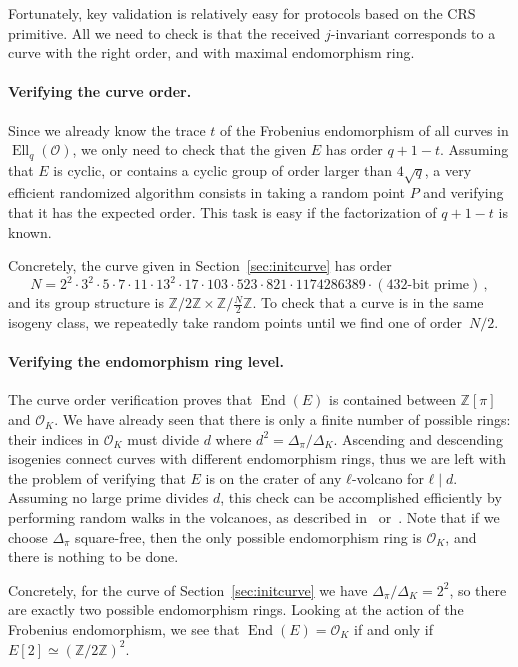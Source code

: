 \documentclass{llncs}
\renewcommand{\O}{\mathcal{O}}
\DeclareMathOperator{\End}{End}
\DeclareMathOperator{\Ell}{Ell}
\begin{document}
Fortunately, key validation is relatively easy for protocols based on
the CRS primitive. 
All we need to check is that the received $j$-invariant
corresponds to a curve with the right order, and with maximal endomorphism ring. 

\paragraph{Verifying the curve order.} Since we already know the trace $t$
of the Frobenius endomorphism of all curves in $\Ell_q(\O)$, 
we only need to check that the given $E$ has order $q+1-t$.
Assuming that $E$ is cyclic, or contains a
cyclic group of order larger than $4\sqrt{q}$, a very efficient
randomized algorithm consists in taking a random point $P$ and
verifying that it has the expected order.  This task is easy if the
factorization of $q+1-t$ is known.

Concretely, the curve given in Section~\ref{sec:initcurve} has order
\[
    N 
    = 
    2^2 · 3^2 · 5 · 7 · 11 · 13^2 · 17 · 103 · 523 · 821 · 1174286389
    · (\text{432-bit prime})
    \,,
\] %
and its group structure is
$ℤ/2ℤ×ℤ/\frac{N}{2}ℤ$. To check that a curve is in the same isogeny
class, we repeatedly take random points until we find one of order~$N/2$.

\paragraph{Verifying the endomorphism ring level.} 
The curve order verification proves that $\End(E)$ 
is contained between $ℤ[π]$ and $\O_K$. 
We have already seen that there is only a finite number of
possible rings: their indices in $\O_K$ must divide $d$ where $d^2=Δ_π/Δ_K$.
Ascending and descending isogenies connect curves with different endomorphism
rings, thus we are left with the problem of verifying that $E$ is on
the crater of any $ℓ$-volcano for $ℓ\mid d$.
Assuming no large prime divides $d$, this check can be
accomplished efficiently by performing random walks in the volcanoes,
as described in~\cite[\S4.2]{kohel} or~\cite{fouquet+morain02}. 
Note that if we choose $Δ_π$ square-free, 
then the only possible endomorphism ring is $\O_K$,
and there is nothing to be done.

Concretely, for the curve of Section~\ref{sec:initcurve}
we have $Δ_π/Δ_K=2^2$,
so there are exactly two possible endomorphism rings. Looking at
the action of the Frobenius endomorphism, we see that $\End(E)=\O_K$
if and only if $E[2]≃(ℤ/2ℤ)^2$.
\end{document}
